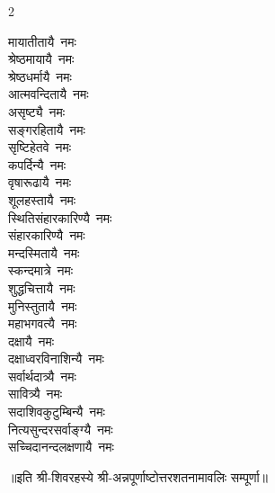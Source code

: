 \begin{multicols}{2}
\begin{flushleft}
मायातीतायै~नमः\\
श्रेष्ठमायायै~नमः\\
श्रेष्ठधर्मायै~नमः\\
आत्मवन्दितायै~नमः\\
असृष्ट्यै~नमः\\
सङ्गरहितायै~नमः\hfill{}\\
सृष्टिहेतवे~नमः\\
कपर्दिन्यै~नमः\\
वृषारूढायै~नमः\\
शूलहस्तायै~नमः\\
स्थितिसंहारकारिण्यै~नमः\\
संहारकारिण्यै~नमः\\
मन्दस्मितायै~नमः\\
स्कन्दमात्रे~नमः\\
शुद्धचित्तायै~नमः\\
मुनिस्तुतायै~नमः\hfill{}\\
महाभगवत्यै~नमः\\
दक्षायै~नमः\\
दक्षाध्वरविनाशिन्यै~नमः\\
सर्वार्थदात्र्यै~नमः\\
सावित्र्यै~नमः\\
सदाशिवकुटुम्बिन्यै~नमः\\
नित्यसुन्दरसर्वाङ्ग्यै~नमः\\
सच्चिदानन्दलक्षणायै~नमः\\
\end{flushleft}
\end{multicols}
॥इति श्री-शिवरहस्ये श्री-अन्नपूर्णाष्टोत्तर\-शतनामावलिः सम्पूर्णा॥
